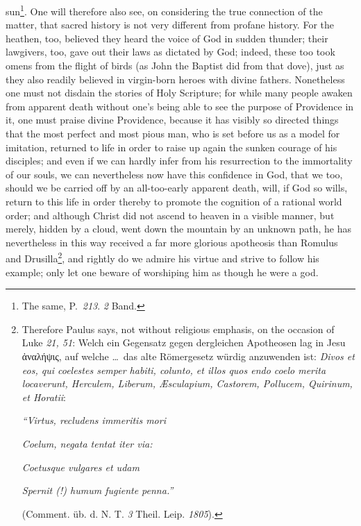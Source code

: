 \documentclass[12pt]{book}
\newcommand{\opage}[1]{\marginnote{\footnotesize\textit{[#1]}}}
\begin{document}
sun\footnote{The same, P.~\textit{213}. \textit{2} Band.}. One will therefore
also see, on considering the true connection of the matter, that sacred history
is not very different from profane history. For the heathen, too, believed
they heard the voice of God in sudden thunder; their lawgivers, too, gave out
their laws as dictated by God; indeed, these too took omens from the flight of
birds (as John the Baptist did from that dove), just as they also readily
believed in virgin-born heroes with divine fathers. Nonetheless one must not
disdain the stories of Holy Scripture; for while many people awaken from
apparent death without one's being able to see the purpose of Providence in
it, one must praise divine Providence, because it has visibly so directed
things that the most perfect and most pious man, who is set before us as a
model for imitation, returned to life in order to raise up again the sunken
courage of his disciples; and even if we can hardly infer from his resurrection
to the immortality of our souls, we can
%
%
\opage{96} %
\setcounter{footnote}{0}%
nevertheless now have this confidence in God, that we too, should we be carried
off by an all-too-early apparent death, will, if God so wills, return to this
life in order thereby to promote the cognition of a rational world order; and
although Christ did not ascend to heaven in a visible manner, but merely,
hidden by a cloud, went down the mountain by an unknown path, he has
nevertheless in this way received a far more glorious apotheosis than Romulus
and Drusilla\footnote{Therefore Paulus says, not without religious emphasis, on
the occasion of Luke \textit{21, 51}: Welch ein Gegensatz gegen dergleichen
Apotheosen lag in Jesu ἀναλήψις, auf welche \ldots\ das alte Römergesetz würdig
anzuwenden ist: \textit{Divos et eos, qui coelestes semper habiti,
\emph{colunto, et illos quos endo coelo merita locaverunt}, Herculem, Liberum,
Æsculapium, Castorem, Pollucem, Quirinum, et Horatii}:\par
\hspace*{2em}\textit{``Virtus, recludens immeritis mori}\par
\hspace*{2em}\textit{Coelum, negata tentat iter via:}\par
\hspace*{2em}\textit{Coetusque vulgares et udam}\par
\hspace*{2em}\textit{\emph{Spernit} (!) humum fugiente penna.''}\par
(Comment. üb. d. N. T. \textit{3} Theil. Leip. \textit{1805}).}, and rightly do
we admire his virtue and strive to follow his example; only let one beware of
worshiping him as though he were a god.
\end{document}
